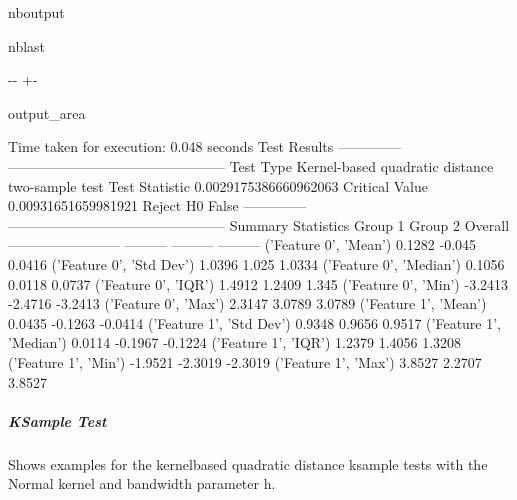 \documentclass[letterpaper,10pt,english,openany,oneside]{sphinxmanual}
\begin{document}
\begin{sphinxuseclass}{nboutput}
\begin{sphinxuseclass}{nblast}
{

\kern-\sphinxverbatimsmallskipamount\kern-\baselineskip
\kern+\FrameHeightAdjust\kern-\fboxrule
\vspace{\nbsphinxcodecellspacing}

\begin{sphinxuseclass}{output_area}
\begin{sphinxuseclass}{}


\begin{sphinxVerbatim}[commandchars=\\\{\}]
Time taken for execution: 0.048 seconds
Test Results
--------------  -----------------------------------------------
Test Type       Kernel-based quadratic distance two-sample test
Test Statistic  0.0029175386660962063
Critical Value  0.00931651659981921
Reject H0       False
--------------  -----------------------------------------------
Summary Statistics
                            Group 1    Group 2    Overall
------------------------  ---------  ---------  ---------
('Feature 0', 'Mean')        0.1282    -0.045      0.0416
('Feature 0', 'Std Dev')     1.0396     1.025      1.0334
('Feature 0', 'Median')      0.1056     0.0118     0.0737
('Feature 0', 'IQR')         1.4912     1.2409     1.345
('Feature 0', 'Min')        -3.2413    -2.4716    -3.2413
('Feature 0', 'Max')         2.3147     3.0789     3.0789
('Feature 1', 'Mean')        0.0435    -0.1263    -0.0414
('Feature 1', 'Std Dev')     0.9348     0.9656     0.9517
('Feature 1', 'Median')      0.0114    -0.1967    -0.1224
('Feature 1', 'IQR')         1.2379     1.4056     1.3208
('Feature 1', 'Min')        -1.9521    -2.3019    -2.3019
('Feature 1', 'Max')         3.8527     2.2707     3.8527
\end{sphinxVerbatim}



\end{sphinxuseclass}
\end{sphinxuseclass}
}

\end{sphinxuseclass}
\end{sphinxuseclass}

\subparagraph{K\sphinxhyphen{}Sample Test}
\label{\detokenize{user_guide/basic_usage:K-Sample-Test}}
\sphinxAtStartPar
Shows examples for the kernel\sphinxhyphen{}based quadratic distance k\sphinxhyphen{}sample tests with the Normal kernel and bandwidth parameter h.
\end{document}
